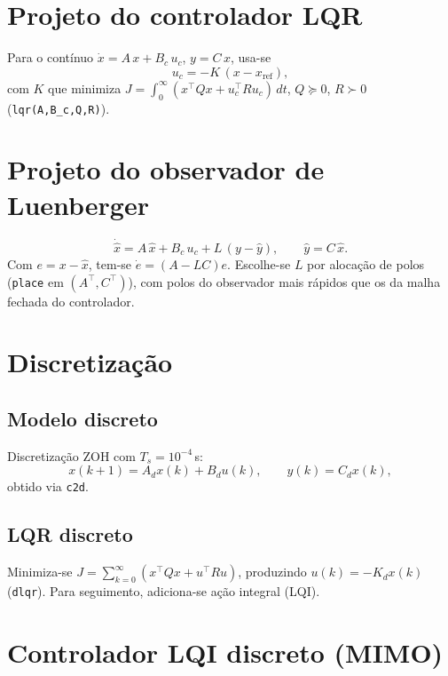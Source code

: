 \section{Projeto do controlador LQR}
\label{sec:controle-lqr-luenberger}

Para o contínuo $\dot{x}=A\,x+B_c\,u_c$, $y=C\,x$, usa-se
\[
u_c=-K\,(x-x_{\mathrm{ref}}),
\]
com $K$ que minimiza $J=\int_0^\infty (x^\top Q x+u_c^\top R u_c)\,dt$, $Q\succeq 0$, $R\succ 0$ (\texttt{lqr(A,B\_c,Q,R)}).

\section{Projeto do observador de Luenberger}
\label{sec:projeto-observador-luenberger}

\[
\dot{\hat{x}}=A\,\hat{x}+B_c\,u_c+L\,(y-\hat{y}),\qquad \hat{y}=C\,\hat{x}.
\]
Com $e=x-\hat{x}$, tem-se $\dot{e}=(A-LC)e$. Escolhe-se $L$ por alocação de polos (\texttt{place} em $(A^\top,C^\top)$), com polos do observador mais rápidos que os da malha fechada do controlador.

\section{Discretização}
\label{sec:discretizacao-sistema}

\subsection{Modelo discreto}
\label{sec:modelo-discreto}

Discretização ZOH com $T_s=10^{-4}$\,s:
\[
x(k+1)=A_d x(k)+B_d u(k),\qquad y(k)=C_d x(k),
\]
obtido via \texttt{c2d}.

\subsection{LQR discreto}
\label{sec:projeto-lqr-discreto}

Minimiza-se $J=\sum_{k=0}^\infty (x^\top Qx+u^\top Ru)$, produzindo $u(k)=-K_d x(k)$ (\texttt{dlqr}). Para seguimento, adiciona-se ação integral (LQI).

\section{Controlador LQI discreto (MIMO)}
\label{sec:controle-lqi-discreto}

